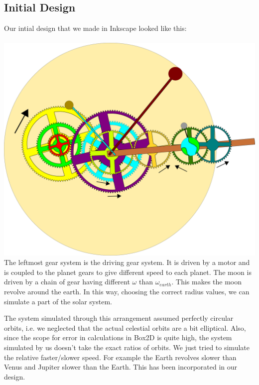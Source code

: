 \documentclass[12pt]{article}
\begin{document}
\subsection{Initial Design}
Our intial design that we made in Inkscape looked like this:
\\ \\
\includegraphics[scale=0.1]{./img/svg.png}
\\

The leftmost gear system is the driving gear system. It is driven by a motor and is coupled to the planet gears to give different speed to each planet. The moon is driven by a chain of gear having different $\omega$ than $\omega_{earth}$. This makes the moon revolve around the earth. In this way, choosing the correct radius values, we can simulate a part of the solar system.

The system simulated through this arrangement assumed perfectly circular orbits, i.e. we neglected that the actual celestial orbits are a bit elliptical. Also, since the scope for error in calculations in Box2D is quite high, the system simulated by us doesn't take the exact ratios of orbits. We just tried to simulate the relative faster/slower speed. For example the Earth revolves slower than Venus and Jupiter slower than the Earth. This has been incorporated in our design.
\end{document}
